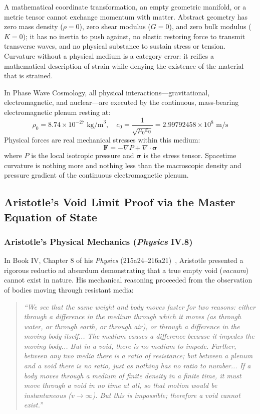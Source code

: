\documentclass[11pt,a4paper]{article}
\begin{document}
A mathematical coordinate transformation, an empty geometric manifold, or a metric tensor cannot exchange momentum with matter. Abstract geometry has zero mass density ($\rho = 0$), zero shear modulus ($G = 0$), and zero bulk modulus ($K = 0$); it has no inertia to push against, no elastic restoring force to transmit transverse waves, and no physical substance to sustain stress or tension. Curvature without a physical medium is a category error: it reifies a mathematical description of strain while denying the existence of the material that is strained.

In Phase Wave Cosmology, all physical interactions---gravitational, electromagnetic, and nuclear---are executed by the continuous, mass-bearing electromagnetic plenum resting at:
\begin{equation}
\rho_0 = 8.74 \times 10^{-27}\text{ kg/m}^3, \quad c_0 = \frac{1}{\sqrt{\mu_0\varepsilon_0}} = 2.99792458 \times 10^8\text{ m/s}
\end{equation}
Physical forces are real mechanical stresses within this medium:
\begin{equation}
\mathbf{F} = -\nabla P + \nabla \cdot \boldsymbol{\sigma}
\end{equation}
where $P$ is the local isotropic pressure and $\boldsymbol{\sigma}$ is the stress tensor. Spacetime curvature is nothing more and nothing less than the macroscopic density and pressure gradient of the continuous electromagnetic plenum.

\subsection{Aristotle's Void Limit Proof via the Master Equation of State}
\label{subsec:aristotle_void_limit}

\subsubsection{Aristotle's Physical Mechanics (\textit{Physics} IV.8)}

In Book IV, Chapter 8 of his \textit{Physics} (215a24--216a21)~\cite{AristotlePhysics}, Aristotle presented a rigorous reductio ad absurdum demonstrating that a true empty void (\textit{vacuum}) cannot exist in nature. His mechanical reasoning proceeded from the observation of bodies moving through resistant media:
\begin{quote}
\textit{``We see that the same weight and body moves faster for two reasons: either through a difference in the medium through which it moves (as through water, or through earth, or through air), or through a difference in the moving body itself... The medium causes a difference because it impedes the moving body... But in a void, there is no medium to impede. Further, between any two media there is a ratio of resistance; but between a plenum and a void there is no ratio, just as nothing has no ratio to number... If a body moves through a medium of finite density in a finite time, it must move through a void in no time at all, so that motion would be instantaneous ($v \to \infty$). But this is impossible; therefore a void cannot exist.''}
\end{quote}
\end{document}
